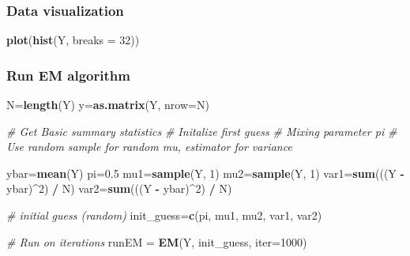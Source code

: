 \documentclass[
]{article}
\newenvironment{Shaded}{\begin{snugshade}}{\end{snugshade}}
\newcommand{\AttributeTok}[1]{\textcolor[rgb]{0.13,0.29,0.53}{#1}}
\newcommand{\CommentTok}[1]{\textcolor[rgb]{0.56,0.35,0.01}{\textit{#1}}}
\newcommand{\DecValTok}[1]{\textcolor[rgb]{0.00,0.00,0.81}{#1}}
\newcommand{\FloatTok}[1]{\textcolor[rgb]{0.00,0.00,0.81}{#1}}
\newcommand{\FunctionTok}[1]{\textcolor[rgb]{0.13,0.29,0.53}{\textbf{#1}}}
\newcommand{\NormalTok}[1]{#1}
\newcommand{\OtherTok}[1]{\textcolor[rgb]{0.56,0.35,0.01}{#1}}
\newcommand{\SpecialCharTok}[1]{\textcolor[rgb]{0.81,0.36,0.00}{\textbf{#1}}}
\begin{document}
\begin{Shaded}
\end{Shaded}

\subsubsection{Data visualization}\label{data-visualization}

\begin{Shaded}
\begin{Highlighting}[]
\FunctionTok{plot}\NormalTok{(}\FunctionTok{hist}\NormalTok{(Y, }\AttributeTok{breaks =} \DecValTok{32}\NormalTok{))}
\end{Highlighting}
\end{Shaded}

\subsubsection{Run EM algorithm}\label{run-em-algorithm}

\begin{Shaded}
\begin{Highlighting}[]
\NormalTok{N}\OtherTok{=}\FunctionTok{length}\NormalTok{(Y)}
\NormalTok{y}\OtherTok{=}\FunctionTok{as.matrix}\NormalTok{(Y, }\AttributeTok{nrow=}\NormalTok{N)}

\CommentTok{\# Get Basic summary statistics}
\CommentTok{\# Initalize first guess}
\CommentTok{\# Mixing parameter pi}
\CommentTok{\# Use random sample for random mu, estimator for variance}

\NormalTok{ybar}\OtherTok{=}\FunctionTok{mean}\NormalTok{(Y)}
\NormalTok{pi}\OtherTok{=}\FloatTok{0.5}
\NormalTok{mu1}\OtherTok{=}\FunctionTok{sample}\NormalTok{(Y, }\DecValTok{1}\NormalTok{)}
\NormalTok{mu2}\OtherTok{=}\FunctionTok{sample}\NormalTok{(Y, }\DecValTok{1}\NormalTok{)}
\NormalTok{var1}\OtherTok{=}\FunctionTok{sum}\NormalTok{(((Y }\SpecialCharTok{{-}}\NormalTok{ ybar)}\SpecialCharTok{\^{}}\DecValTok{2}\NormalTok{) }\SpecialCharTok{/}\NormalTok{ N)}
\NormalTok{var2}\OtherTok{=}\FunctionTok{sum}\NormalTok{(((Y }\SpecialCharTok{{-}}\NormalTok{ ybar)}\SpecialCharTok{\^{}}\DecValTok{2}\NormalTok{) }\SpecialCharTok{/}\NormalTok{ N)}

\CommentTok{\# initial guess (random)}
\NormalTok{init\_guess}\OtherTok{=}\FunctionTok{c}\NormalTok{(pi, mu1, mu2, var1, var2)}

\CommentTok{\# Run on iterations}
\NormalTok{runEM }\OtherTok{=} \FunctionTok{EM}\NormalTok{(Y, init\_guess, }\AttributeTok{iter=}\DecValTok{1000}\NormalTok{)}
\end{Highlighting}
\end{Shaded}
\end{document}
